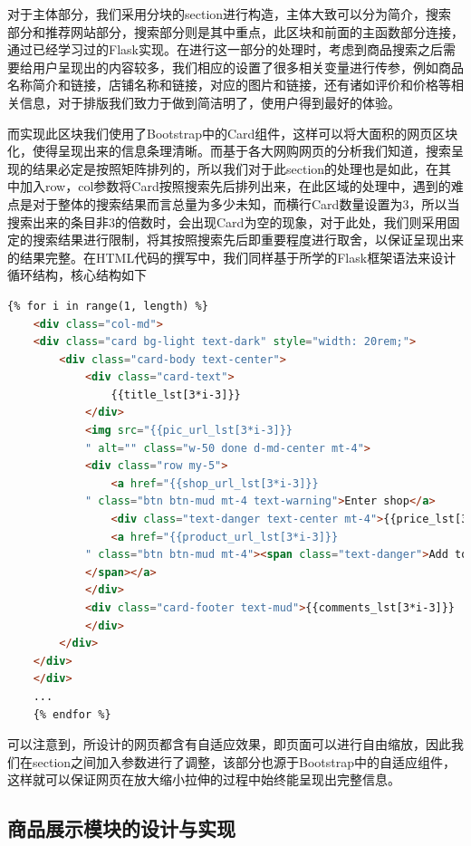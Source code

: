 \documentclass[a4paper,12pt]{article}
\begin{document}
    对于主体部分，我们采用分块的section进行构造，主体大致可以分为简介，搜索部分和推荐网站部分，搜索部分则是其中重点，此区块和前面的主函数部分连接，通过已经学习过的Flask实现。在进行这一部分的处理时，考虑到商品搜索之后需要给用户呈现出的内容较多，我们相应的设置了很多相关变量进行传参，例如商品名称简介和链接，店铺名称和链接，对应的图片和链接，还有诸如评价和价格等相关信息，对于排版我们致力于做到简洁明了，使用户得到最好的体验。

    而实现此区块我们使用了Bootstrap中的Card组件，这样可以将大面积的网页区块化，使得呈现出来的信息条理清晰。而基于各大网购网页的分析我们知道，搜索呈现的结果必定是按照矩阵排列的，所以我们对于此section的处理也是如此，在其中加入row，col参数将Card按照搜索先后排列出来，在此区域的处理中，遇到的难点是对于整体的搜索结果而言总量为多少未知，而横行Card数量设置为3，所以当搜索出来的条目非3的倍数时，会出现Card为空的现象，对于此处，我们则采用固定的搜索结果进行限制，将其按照搜索先后即重要程度进行取舍，以保证呈现出来的结果完整。在HTML代码的撰写中，我们同样基于所学的Flask框架语法来设计循环结构，核心结构如下

    \begin{lstlisting}[language=html]
    {% for i in range(1, length) %}
    <div class="col-md">
    <div class="card bg-light text-dark" style="width: 20rem;">
        <div class="card-body text-center">
            <div class="card-text">
                {{title_lst[3*i-3]}}
            </div>
            <img src="{{pic_url_lst[3*i-3]}}
            " alt="" class="w-50 done d-md-center mt-4">
            <div class="row my-5">
                <a href="{{shop_url_lst[3*i-3]}}
            " class="btn btn-mud mt-4 text-warning">Enter shop</a>
                <div class="text-danger text-center mt-4">{{price_lst[3*i-3]}}</div>
                <a href="{{product_url_lst[3*i-3]}}
            " class="btn btn-mud mt-4"><span class="text-danger">Add to Chart
            </span></a>
            </div>
            <div class="card-footer text-mud">{{comments_lst[3*i-3]}}
            </div>
        </div>
    </div>
    </div>
    ...
    {% endfor %}
    \end{lstlisting}

    可以注意到，所设计的网页都含有自适应效果，即页面可以进行自由缩放，因此我们在section之间加入参数进行了调整，该部分也源于Bootstrap中的自适应组件，这样就可以保证网页在放大缩小拉伸的过程中始终能呈现出完整信息。

    \subsection{商品展示模块的设计与实现}
\end{document}
